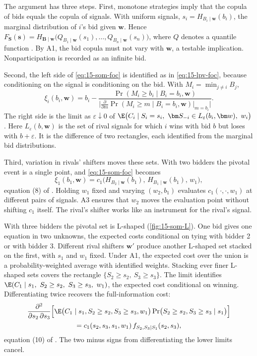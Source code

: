  The argument has three steps. First, monotone strategies imply that the copula of bids
equals the copula of signals. With uniform signals, $s_i=H_{B_i\mid\bm w}(b_i)$, the marginal distribution of
$i$'s bid given $\bm w$. Hence $F_{\bm S}(\bm s)=H_{\bm B\mid\bm w}\bigl(Q_{B_1\mid\bm w}(s_1),\dots,Q_{B_n\mid\bm
w}(s_n)\bigr)$, where $Q$ denotes a quantile function \citep[Lemma~1 and Proposition~3]{Somaini2020}. By A1, the
bid copula must not vary with $\bm w$, a testable implication. Nonparticipation is recorded as an infinite bid.

Second, the left side of \eqref{eq:15-som-foc} is identified as in \eqref{eq:15-lpv-foc}, because conditioning on
the signal is conditioning on the bid. With $M_i=\min_{j\ne i}B_j$,
\begin{equation}\label{eq:15-som-xi}
  \xi_i(b_i,\bm w)=b_i-\frac{\Pr(M_i\ge b_i\mid B_i=b_i,\bm w)}{\bigl|\frac{\partial}{\partial m}\Pr(M_i\ge m\mid
  B_i=b_i,\bm w)\big|_{m=b_i}\bigr|} .
\end{equation}
The right side is the limit as $\varepsilon\downarrow0$ of $\E\bigl(C_i\mid S_i=s_i,\ \bm S_{-i}\in
L_\varepsilon(b_i,\bm w),\ w_i\bigr)$. Here $L_\varepsilon(b,\bm w)$ is the set of rival signals for which $i$ wins
with bid $b$ but loses with $b+\varepsilon$. It is the difference of two rectangles, each identified from the
marginal bid distributions.

Third, variation in rivals' shifters moves these sets. With two bidders the pivotal event is a single point, and
\eqref{eq:15-som-foc} becomes
\begin{equation}\label{eq:15-som-two}
  \xi_1(b_1,\bm w)=c_1\bigl(H_{B_2\mid\bm w}(b_1),\,H_{B_1\mid\bm w}(b_1),\,w_1\bigr),
\end{equation}
equation (8) of \citet{Somaini2020}. Holding $w_1$ fixed and varying $(w_2,b_1)$ evaluates $c_1(\cdot,\cdot,w_1)$
at different pairs of signals. A3 ensures that $w_2$ moves the evaluation point without shifting $c_1$ itself. The
rival's shifter works like an instrument for the rival's signal.

With three bidders the pivotal set is L-shaped (\cref{fig:15-som-L}). One bid gives one equation in two
unknowns, the expected costs conditional on tying with bidder 2 or with bidder 3. Different rival shifters
$\bm w'$ produce another L-shaped set stacked on the first, with $s_1$ and $w_1$ fixed. Under A1, the expected
cost over the union is a probability-weighted average with identified weights. Stacking ever finer L-shaped sets
covers the rectangle $\{S_2\ge s_2,\ S_3\ge s_3\}$. The limit identifies $\E(C_1\mid s_1,\ S_2\ge s_2,\ S_3\ge
s_3,\ w_1)$, the expected cost conditional on winning. Differentiating twice recovers the full-information cost:
\begin{multline}\label{eq:15-som-diff}
  \frac{\partial^2}{\partial s_2\,\partial s_3}\Bigl[\E\bigl(C_1\mid s_1,S_2\ge s_2,S_3\ge s_3,w_1\bigr)
  \Pr\bigl(S_2\ge s_2,S_3\ge s_3\mid s_1\bigr)\Bigr]\\
  =c_1(s_2,s_3,s_1,w_1)\,f_{S_2,S_3\mid S_1}(s_2,s_3),
\end{multline}
equation (10) of \citet{Somaini2020}. The two minus signs from differentiating the lower limits cancel.

